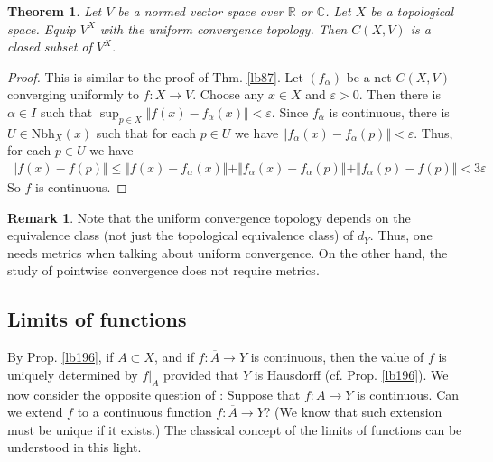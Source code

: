 \documentclass[12pt,b5paper,notitlepage]{article}
\theoremstyle{definition}
\newtheorem{rem}[df]{Remark}
\theoremstyle{plain}
\newtheorem{thm}[df]{Theorem}
\newcommand{\ovl}{\overline}
\newcommand{\Cbb}{\mathbb C}
\newcommand{\Rbb}{\mathbb R}
\newcommand{\Nbh}{\mathrm{Nbh}}
\newcommand{\eps}{\varepsilon}
\numberwithin{equation}{section}
\begin{document}
\begin{thm}\label{lb279}
Let $V$ be a normed vector space over $\Rbb$ or $\Cbb$. Let $X$ be a topological space. Equip $V^X$ with the uniform convergence topology. Then $C(X,V)$ is a closed subset of $V^X$.
\end{thm}

\begin{proof}
This is similar to the proof of Thm. \ref{lb87}. Let $(f_\alpha)$ be a net $C(X,V)$ converging uniformly to $f:X\rightarrow V$. Choose any $x\in X$ and $\eps>0$. Then there is $\alpha\in I$ such that $\sup_{p\in X}\Vert f(x)-f_\alpha(x)\Vert<\eps$. Since $f_\alpha$ is continuous, there is $U\in\Nbh_X(x)$ such that for each $p\in U$ we have $\Vert f_\alpha(x)-f_\alpha(p)\Vert<\eps$. Thus, for each $p\in U$ we have 
\begin{align*}
\Vert f(x)-f(p)\Vert\leq \Vert f(x)-f_\alpha(x)\Vert +\Vert f_\alpha(x)-f_\alpha(p)\Vert+\Vert f_\alpha(p)-f(p)\Vert<3\eps
\end{align*}
So $f$ is continuous.
\end{proof}


\begin{rem}
Note that the uniform convergence topology depends on the equivalence class (not just the topological equivalence class) of $d_Y$. Thus, one needs metrics when talking about uniform convergence. On the other hand, the study of pointwise convergence does not require metrics.
\end{rem}

\subsection{Limits of functions}\label{lb290}




By Prop. \ref{lb196}, if $A\subset X$,  and if $f:\ovl A\rightarrow Y$ is continuous, then the value of $f$ is uniquely determined by $f|_A$ provided that $Y$ is Hausdorff (cf. Prop. \ref{lb196}). We now consider the opposite question of : Suppose that $f:A\rightarrow Y$ is continuous. Can we extend $f$ to a continuous function $f:\ovl A\rightarrow Y$? (We know that such extension must be unique if it exists.) The classical concept of the limits of functions can be understood in this light.
\end{document}
